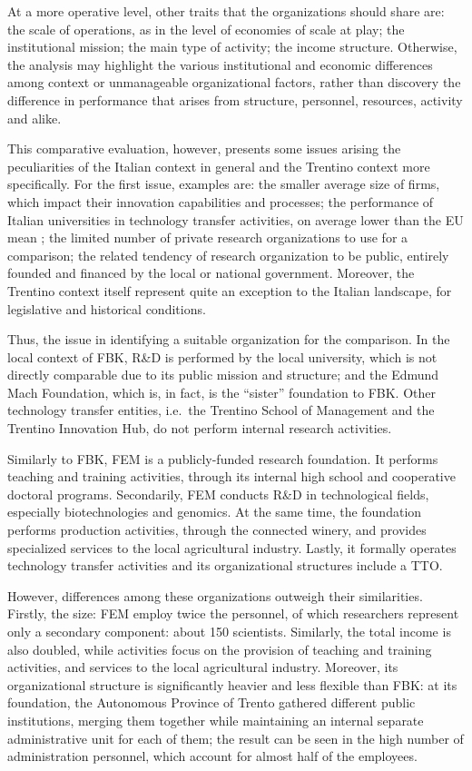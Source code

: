 At a more operative level, other traits that the organizations should share are: the scale of operations, as in the level of economies of scale at play; the institutional mission; the main type of activity; the income structure. Otherwise, the analysis may highlight the various institutional and economic differences among context or unmanageable organizational factors, rather than discovery the difference in performance that arises from structure, personnel, resources, activity and alike.

This comparative evaluation, however, presents some issues arising the peculiarities of the Italian context in general and the Trentino context more specifically. For the first issue, examples are: the smaller average size of firms, which impact their innovation capabilities and processes; the performance of Italian universities in technology transfer activities, on average lower than the EU mean \citep{Balderi2007}; the limited number of private research organizations to use for a comparison; the related tendency of research organization to be public, entirely founded and financed by the local or national government. Moreover, the Trentino context itself  represent quite an exception to the Italian landscape, for legislative and historical conditions. 

Thus, the issue in identifying a suitable organization for the comparison. In the local context of FBK, R\&D is performed by the local university, which is not directly comparable due to its public mission and structure; and the Edmund Mach Foundation, which is, in fact, is the \enquote{sister} foundation to FBK. Other technology transfer entities, i.e.\ the Trentino School of Management and the Trentino Innovation Hub, do not perform internal research activities.

Similarly to FBK, FEM is a publicly-funded research foundation. It performs teaching and training activities, through its internal high school and cooperative doctoral programs. Secondarily, FEM conducts R\&D in technological fields, especially  biotechnologies and genomics. At the same time, the foundation performs production activities, through the connected winery, and provides specialized services to the local agricultural industry. Lastly, it formally operates technology transfer activities and its organizational structures include a TTO.

However, differences among these organizations outweigh their similarities. Firstly, the size: FEM employ twice the  personnel, of which researchers represent only a secondary component: about 150 scientists. Similarly, the total income is also doubled, while activities focus on the provision of teaching and training activities, and services to the local agricultural industry. Moreover, its organizational structure is significantly heavier and less flexible than FBK: at its foundation, the Autonomous Province of Trento gathered different public institutions, merging them together while maintaining an internal separate administrative unit for each of them; the result can be seen in the high number of administration personnel, which account for almost half of the employees. 

